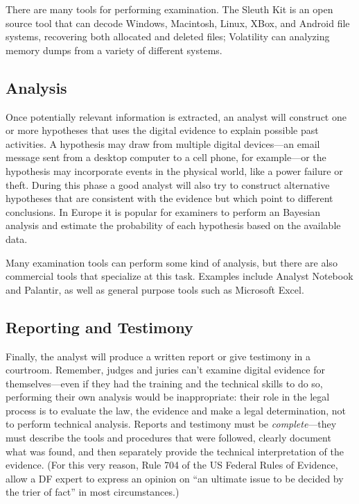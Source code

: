   There are many tools for performing examination. The Sleuth Kit\cite{sleuthkit} is
  an open source tool that can decode Windows, Macintosh, Linux, XBox,
  and Android
  file systems, recovering both allocated and deleted
  files;   Volatility\cite{volatility} can analyzing memory dumps from a
  variety of different systems.

\subsection{Analysis} Once potentially relevant information is
  extracted, an analyst will construct one or more hypotheses that
  uses the digital evidence to explain possible past activities. A
  hypothesis may draw from multiple digital devices---an email message
  sent from a desktop computer to a cell phone, for example---or the
  hypothesis may incorporate events in the physical world, like a
  power failure or theft. During this phase a good analyst will also
  try to construct alternative hypotheses that are consistent with the
  evidence but which point to different conclusions. In Europe it is
  popular for examiners to perform an Bayesian analysis and estimate
  the probability of each hypothesis based on the available data.

  Many examination tools can perform some kind of analysis, but there
  are also commercial tools that specialize at this task. Examples
  include Analyst Notebook\cite{analysts_notebook} and
  Palantir\cite{palantir}, as well as general purpose tools such as
  Microsoft Excel.

\subsection{Reporting and Testimony} Finally, the analyst will
  produce a written report or give testimony in a courtroom. Remember,
  judges and juries can't examine digital evidence for
  themselves---even if they had the training and the technical skills
  to do so, performing their own analysis would be inappropriate:
  their role in the legal process is to evaluate the law, the evidence
  and make a legal determination, not to perform technical
  analysis. Reports and testimony must be
  \emph{complete}---they must describe the tools and procedures
  that were followed, clearly document what was found, and then
  separately provide the technical interpretation of the
  evidence. (For this very reason, Rule 704 of the US Federal Rules of
  Evidence, allow a DF expert to
  express an opinion on ``an ultimate issue to be decided by the trier
  of fact'' in most circumstances.)

